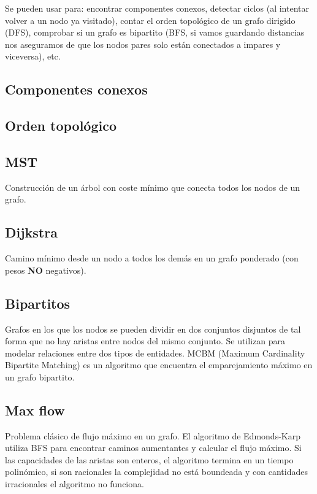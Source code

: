 Se pueden usar para: encontrar componentes conexos, detectar ciclos (al intentar volver
a un nodo ya visitado), contar el orden topológico de un grafo dirigido (DFS),
comprobar si un grafo es bipartito (BFS, si vamos guardando distancias nos aseguramos de
que los nodos pares solo están conectados a impares y viceversa), etc.


\subsection{Componentes conexos}

\subsection{Orden topológico}

\subsection{MST}
Construcción de un árbol con coste mínimo que conecta todos los nodos de un grafo.

\subsection{Dijkstra}
Camino mínimo desde un nodo a todos los demás en un grafo ponderado (con pesos
\textbf{NO} negativos).


\subsection{Bipartitos}
Grafos en los que los nodos se pueden dividir en dos conjuntos disjuntos de tal
forma que no hay aristas entre nodos del mismo conjunto. Se utilizan para
modelar relaciones entre dos tipos de entidades. MCBM (Maximum Cardinality
Bipartite Matching) es un algoritmo que encuentra el emparejamiento máximo en un
grafo bipartito.

\subsection{Max flow}
Problema clásico de flujo máximo en un grafo. El algoritmo de Edmonds-Karp
utiliza BFS para encontrar caminos aumentantes y calcular el flujo máximo.
Si las capacidades de las aristas son enteros, el algoritmo termina en un
tiempo polinómico, si son racionales la complejidad no está boundeada y
con cantidades irracionales el algoritmo no funciona.

